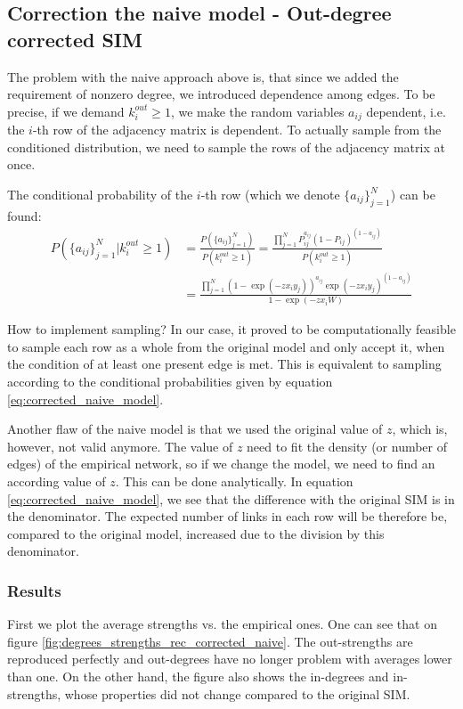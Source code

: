 \subsection{Correction the naive model - Out-degree corrected SIM}

The problem with the naive approach above is, that since we added the requirement of nonzero degree, we introduced dependence among edges. To be precise, if we demand $k_i^{out}\geq 1$, we make the random variables ${a_{ij}}$ dependent, i.e. the $i$-th row of the adjacency matrix is dependent. To actually sample from the conditioned distribution, we need to sample the rows of the adjacency matrix at once.

The conditional probability of the $i$-th row (which we denote $\{a_{ij}\}_{j=1}^N$) can be found:
\begin{align}
    P\left(\{a_{ij}\}_{j=1}^N|k_i^{out}\geq 1\right)
    &= \frac{P\left(\{a_{ij}\}_{j=1}^N\right)}{P(k_i^{out}\geq 1)} = \frac{ \prod_{j=1}^N P_{ij}^{a_{ij}}(1-P_{ij})^{(1-a_{ij})} }{P(k_i^{out}\geq 1)} \\
    &= \frac{ \prod_{j=1}^N (1 - \exp(-z x_i y_j))^{a_{ij}}\exp(-z x_i y_j)^{(1-a_{ij})} }{1 - \exp(-zx_i W)}
    \label{eq:corrected_naive_model}
\end{align}

How to implement sampling? In our case, it proved to be computationally feasible to sample each row as a whole from the original model and only accept it, when the condition of at least one present edge is met. This is equivalent to sampling according to the conditional probabilities given by equation \ref*{eq:corrected_naive_model}. 

Another flaw of the naive model is that we used the original value of $z$, which is, however, not valid anymore. The value of $z$ need to fit the density (or number of edges) of the empirical network, so if we change the model, we need to find an according value of $z$. This can be done analytically. In equation \ref*{eq:corrected_naive_model}, we see that the difference with the original SIM is in the denominator. The expected number of links in each row will be therefore be, compared to the original model, increased due to the division by this denominator. 




\subsubsection{Results}
First we plot the average strengths vs. the empirical ones. One can see that on figure \ref*{fig:degrees_strengths_rec_corrected_naive}. The out-strengths are reproduced perfectly and out-degrees have no longer problem with averages lower than one. On the other hand, the figure also shows the in-degrees and in-strengths, whose properties did not change compared to the original SIM.


